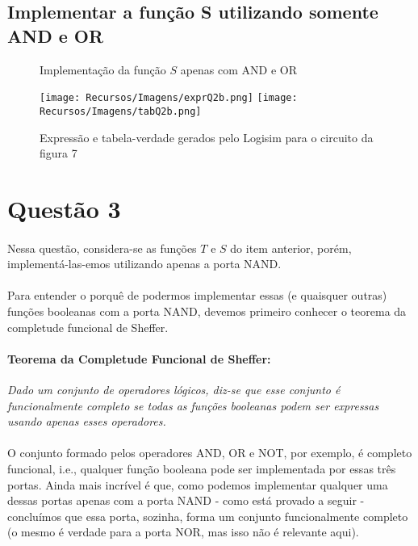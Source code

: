 \documentclass[a4paper, 12pt]{article}
\begin{document}
\subsection{Implementar a função S utilizando somente AND e OR}

\begin{figure}[H]
    \centering
    
    \vspace{-30pt}
    \caption{Implementação da função $S$ apenas com AND e OR}
\end{figure}

\begin{figure}[H]
    \centering
    \texttt{[image: Recursos/Imagens/exprQ2b.png]}
    \texttt{[image: Recursos/Imagens/tabQ2b.png]} \\
    \caption{Expressão e tabela-verdade gerados pelo Logisim para o circuito da figura 7}
\end{figure}

\section{Questão 3}
\paragraph{}
Nessa questão, considera-se as funções $T$ e $S$ do item anterior, porém, implementá-las-emos utilizando apenas a porta NAND.

\paragraph{}
Para entender o porquê de podermos implementar essas (e quaisquer outras) funções booleanas com a porta NAND, devemos primeiro conhecer o teorema da completude funcional de Sheffer.

\paragraph{Teorema da Completude Funcional de Sheffer:}
\textit{Dado um conjunto de operadores lógicos, diz-se que esse conjunto é funcionalmente completo se todas as funções booleanas podem ser expressas usando apenas esses operadores.}

\paragraph{}
O conjunto formado pelos operadores AND, OR e NOT, por exemplo, é completo funcional, i.e., qualquer função booleana pode ser implementada por essas três portas. Ainda mais incrível é que, como podemos implementar qualquer uma dessas portas apenas com a porta NAND - como está provado a seguir - concluímos que essa porta, sozinha, forma um conjunto funcionalmente completo (o mesmo é verdade para a porta NOR, mas isso não é relevante aqui).
\end{document}
